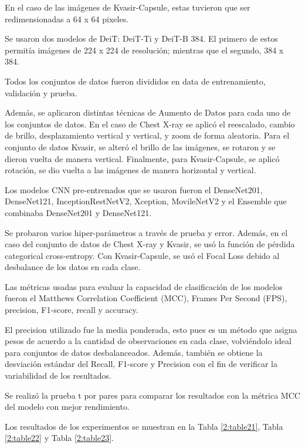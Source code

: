 En el caso de las imágenes de Kvasir-Capsule, estas tuvieron que ser redimensionadas a 64 x 64 pixeles.

Se usaron dos modelos de DeiT: DeiT-Ti y DeiT-B 384. El primero de estos permitía imágenes de 224 x 224 de resolución; mientras que el segundo, 384 x 384.

Todos los conjuntos de datos fueron divididos en data de entrenamiento, validación y prueba.

Además, se aplicaron distintas técnicas de Aumento de Datos para cada uno de los conjuntos de datos. En el caso de Chest X-ray se aplicó el reescalado, cambio de brillo, desplazamiento vertical y vertical, y zoom de forma aleatoria. Para el conjunto de datos Kvasir, se alteró el brillo de las imágenes, se rotaron y se dieron vuelta de manera vertical. Finalmente, para Kvasir-Capsule, se aplicó rotación, se dio vuelta a las imágenes de manera horizontal y vertical.

Los modelos CNN pre-entrenados que se usaron fueron el DenseNet201, DenseNet121, InceptionRestNetV2, Xception, MovileNetV2 y el Ensemble que combinaba DenseNet201 y DenseNet121.

Se probaron varios hiper-parámetros a través de prueba y error. Además, en el caso del conjunto de datos de Chest X-ray y Kvasir, se usó la función de pérdida categorical cross-entropy. Con Kvasir-Capsule, se usó el Focal Loss debido al desbalance de los datos en cada clase.

Las métricas usadas para evaluar la capacidad de clasificación de los modelos fueron el Matthews Correlation Coefficient (MCC), Frames Per Second (FPS), precision, F1-score, recall y accuracy.

El precision utilizado fue la media ponderada, esto pues es un método que asigna pesos de acuerdo a la cantidad de observaciones en cada clase, volviéndolo ideal para conjuntos de datos desbalanceados. Además, también se obtiene la desviación estándar del Recall, F1-score y Precision con el fin de verificar la variabilidad de los resultados.

Se realizó la prueba t por pares para comparar los resultados con la métrica MCC del modelo con mejor rendimiento.

Los resultados de los experimentos se muestran en la Tabla \ref{2:table21}, Tabla \ref{2:table22} y Tabla \ref{2:table23}.

